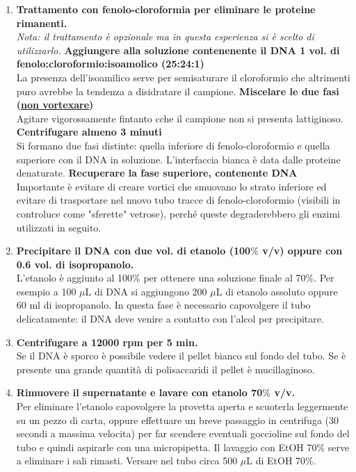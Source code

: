 \documentclass{extarticle}
\begin{document}
\begin{enumerate}
    \item \textbf{Trattamento con fenolo-cloroformia per eliminare le proteine rimanenti.}\\\textit{Nota: il trattamento è opzionale ma in questa esperienza si è scelto di utilizzarlo.}
     \textbf{Aggiungere alla soluzione contenenente il DNA 1 vol. di fenolo:cloroformio:isoamolico (25:24:1)}\\La presenza dell'isoamilico serve per semisaturare il cloroformio che altrimenti puro avrebbe la tendenza a disidratare il campione.
     \textbf{Miscelare le due fasi (\underline{non vortexare})}\\Agitare vigorossamente fintanto cche il campione non si presenta lattiginoso.
     \textbf{Centrifugare almeno 3 minuti}\\Si formano due fasi distinte: quella inferiore di fenolo-cloroformio e quella superiore con il DNA in soluzione. L'interfaccia bianca è data dalle proteine denaturate.
     \textbf{Recuperare la fase superiore, contenente DNA}\\Importante è evitare di creare vortici che smuovano lo strato inferiore ed evitare di trasportare nel nuovo tubo tracce di fenolo-cloroformio (visibili in controluce come "sferette" vetrose), perché queste degraderebbero gli enzimi utilizzati in seguito.
    \item \textbf{Precipitare il DNA con due vol. di etanolo (100$\%$ v/v) oppure con 0.6 vol. di isopropanolo.}\\ L'etanolo è aggiunto al 100$\%$ per ottenere una soluzione finale al 70$\%$. Per esempio a 100  $\mu$L  di DNA si aggiungono 200  $\mu$L  di etanolo assoluto oppure 60 ml di isopropanolo. In questa fase è necessario capovolgere il tubo delicatamente: il DNA deve venire a contatto con l'alcol per precipitare.
    \item \textbf{Centrifugare a 12000 rpm per 5 min.}\\Se il DNA è sporco è possibile vedere il pellet bianco sul fondo del tubo. Se è presente una grande quantità di polisaccaridi il pellet è mucillaginoso.
    \item \textbf{Rimuovere il supernatante e lavare con etanolo 70$\%$ v/v.}\\Per eliminare l'etanolo capovolgere la provetta aperta e scuoterla leggermente su un pezzo di carta, oppure effettuare un breve passaggio in centrifuga (30 secondi a massima velocita) per far scendere eventuali goccioline sul fondo del tubo e quindi aspirarle con una micropipetta. Il lavaggio con EtOH 70$\%$ serve a eliminare i sali rimasti. Versare nel tubo circa 500  $\mu$L  di EtOH 70$\%$.

\end{enumerate}
\end{document}
